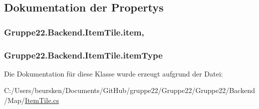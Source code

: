 \subsection{Dokumentation der Propertys}
\hypertarget{class_gruppe22_1_1_backend_1_1_item_tile_a1c70024d6768af2fbeeb988fc14838be}{
\subsubsection[{item}]{ Gruppe22.\-Backend.\-Item\-Tile.\-item\hspace{0.3cm}{\ttfamily [get]}, {\ttfamily [set]}}}\label{class_gruppe22_1_1_backend_1_1_item_tile_a1c70024d6768af2fbeeb988fc14838be}
\hypertarget{class_gruppe22_1_1_backend_1_1_item_tile_a2bda4d14a172ae8b2b7c66c9d2b67c85}{
\subsubsection[{item\-Type}]{ Gruppe22.\-Backend.\-Item\-Tile.\-item\-Type\hspace{0.3cm}{\ttfamily [get]}}}\label{class_gruppe22_1_1_backend_1_1_item_tile_a2bda4d14a172ae8b2b7c66c9d2b67c85}


Die Dokumentation für diese Klasse wurde erzeugt aufgrund der Datei\-:\begin{DoxyCompactItemize}
\item 
C\-:/\-Users/beursken/\-Documents/\-Git\-Hub/gruppe22/\-Gruppe22/\-Gruppe22/\-Backend/\-Map/\hyperlink{_item_tile_8cs}{Item\-Tile.\-cs}\end{DoxyCompactItemize}
